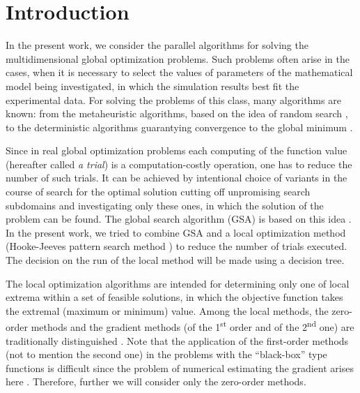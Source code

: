 \documentclass{cmi}
\begin{document}




\section*{Introduction}

In the present work, we consider the parallel algorithms for solving the multidimensional global optimization problems. Such problems often arise in the cases, when it is necessary to select the values  of parameters of the mathematical model being investigated, in which the simulation results best fit the experimental data. For solving the problems of this class, many algorithms are known: from the metaheuristic algorithms, based on the  idea of random search , to the deterministic algorithms guarantying convergence to the global minimum .  

Since in real global optimization problems each computing of the function value (hereafter called  \textit{a trial}) is a computation-costly operation, one has to reduce the number of such trials. It  can be achieved by intentional choice of variants in the course of search for the optimal solution cutting  off unpromising search subdomains and investigating only these ones, in which the solution of the  problem can be found. The global search algorithm (GSA) is based on this idea . In  the present work, we tried to combine GSA and a local optimization method (Hooke-Jeeves pattern search method ) to reduce the number of trials executed. The decision on the run of the local method will be made using a decision tree.

The local optimization algorithms are intended for determining only one of local extrema within a set  of feasible solutions, in which the objective function takes the extremal (maximum or minimum) value.  Among the local methods,  the zero-order methods and the gradient methods (of the 1\textsuperscript{st} order and of the  2\textsuperscript{nd} one) are traditionally distinguished . Note that the application of the first-order methods (not to mention the second one) in the problems  with the ``black-box'' type functions is difficult since the problem of numerical estimating the gradient arises here . Therefore, further we will consider only the zero-order methods. 
\end{document}
